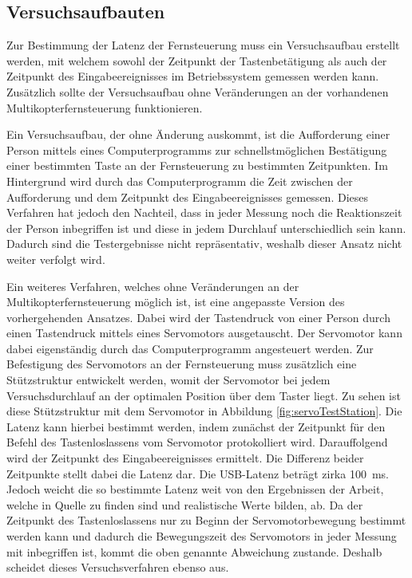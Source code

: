 \subsection{Versuchsaufbauten}
Zur Bestimmung der Latenz der Fernsteuerung muss ein Versuchsaufbau erstellt werden, mit welchem sowohl der Zeitpunkt der Tastenbetätigung als auch der Zeitpunkt des Eingabeereignisses im Betriebssystem gemessen werden kann. Zusätzlich sollte der Versuchsaufbau ohne Veränderungen an der vorhandenen Multikopterfernsteuerung funktionieren.

Ein Versuchsaufbau, der ohne Änderung auskommt, ist die Aufforderung einer Person mittels eines Computerprogramms zur schnellstmöglichen Bestätigung einer bestimmten Taste an der Fernsteuerung zu bestimmten Zeitpunkten. Im Hintergrund wird durch das Computerprogramm die Zeit zwischen der Aufforderung und dem Zeitpunkt des Eingabeereignisses gemessen. Dieses Verfahren hat jedoch den Nachteil, dass in jeder Messung noch die Reaktionszeit der Person inbegriffen ist und diese in jedem Durchlauf unterschiedlich sein kann. Dadurch sind die Testergebnisse nicht repräsentativ, weshalb dieser Ansatz nicht weiter verfolgt wird.

Ein weiteres Verfahren, welches ohne Veränderungen an der Multikopterfernsteuerung möglich ist, ist eine angepasste Version des vorhergehenden Ansatzes. Dabei wird der Tastendruck von einer Person durch einen Tastendruck mittels eines Servomotors ausgetauscht. Der Servomotor kann dabei eigenständig durch das Computerprogramm angesteuert werden. Zur Befestigung des Servomotors an der Fernsteuerung muss zusätzlich eine Stützstruktur entwickelt werden, womit der Servomotor bei jedem Versuchsdurchlauf an der optimalen Position über dem Taster liegt. Zu sehen ist diese Stützstruktur mit dem Servomotor in Abbildung \ref{fig:servoTestStation}. Die Latenz kann hierbei bestimmt werden, indem zunächst der Zeitpunkt für den Befehl des Tastenloslassens vom Servomotor protokolliert wird. Darauffolgend wird der Zeitpunkt des Eingabeereignisses ermittelt. Die Differenz beider Zeitpunkte stellt dabei die Latenz dar. Die \acs{USB}-Latenz beträgt zirka 100~ms. Jedoch weicht die so bestimmte Latenz weit von den Ergebnissen der Arbeit, welche in Quelle \cite{wimmerLatenzStation} zu finden sind und realistische Werte bilden, ab. Da der Zeitpunkt des Tastenloslassens nur zu Beginn der Servomotorbewegung bestimmt werden kann und dadurch die Bewegungszeit des Servomotors in jeder Messung mit inbegriffen ist, kommt die oben genannte Abweichung zustande. Deshalb scheidet dieses Versuchsverfahren ebenso aus.

